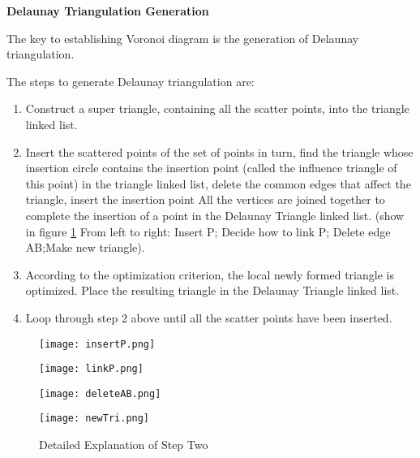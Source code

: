 \documentclass{mcmthesis}
\begin{document}
\textbf{Delaunay Triangulation Generation}

\par The key to establishing Voronoi diagram is the generation of Delaunay triangulation.


\par The steps to generate Delaunay triangulation are: 

\begin{enumerate}
	\item Construct a super triangle, containing all the scatter points, into the triangle linked list.
	\item Insert the scattered points of the set of points in turn, find the triangle whose insertion circle contains the insertion point (called the influence triangle of this point) in the triangle linked list, delete the common edges that affect the triangle, insert the insertion point All the vertices are joined together to complete the insertion of a point in the Delaunay Triangle linked list. (show in figure \ref{fig:Detailed Explanation of Step Two} From left to right: Insert P; Decide how to link P; Delete edge AB;Make new triangle).
	\item According to the optimization criterion, the local newly formed triangle is optimized. Place the resulting triangle in the Delaunay Triangle linked list.
	\item Loop through step 2 above until all the scatter points have been inserted.
\end{enumerate}


\begin{figure}[htbp]  
\centering
\begin{minipage}[t]{0.2\textwidth}
\centering  
\texttt{[image: insertP.png]} \\
\label{fig:Insert node P}
\end{minipage}
\hspace{1ex}
\begin{minipage}[t]{0.2\textwidth}
\centering  
\texttt{[image: linkP.png]} \\
\label{fig:Decide how to link P}
\end{minipage}
\hspace{1ex}
\begin{minipage}[t]{0.2\textwidth}
\centering  
\texttt{[image: deleteAB.png]} \\
\label{fig:Delete edge AB}
\end{minipage}
\hspace{1ex}
\begin{minipage}[t]{0.2\textwidth}  
\centering  
\texttt{[image: newTri.png]}\\
\label{fig:Make new triangle}
\end{minipage}  

\caption{Detailed Explanation of Step Two}
\label{fig:Detailed Explanation of Step Two}
\end{figure} 
\end{document}
